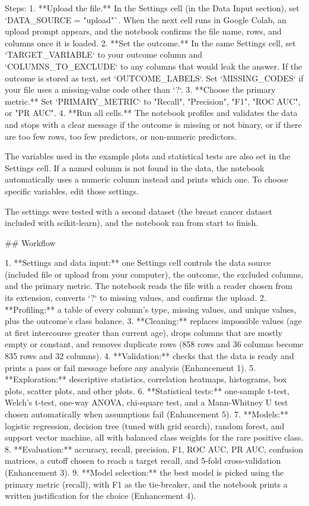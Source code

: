 Steps:
1. **Upload the file.** In the Settings cell (in the Data Input section), set `DATA_SOURCE = "upload"`. When the next cell runs in Google Colab, an upload prompt appears, and the notebook confirms the file name, rows, and columns once it is loaded.
2. **Set the outcome.** In the same Settings cell, set `TARGET_VARIABLE` to your outcome column and `COLUMNS_TO_EXCLUDE` to any columns that would leak the answer. If the outcome is stored as text, set `OUTCOME_LABELS`. Set `MISSING_CODES` if your file uses a missing-value code other than `?`.
3. **Choose the primary metric.** Set `PRIMARY_METRIC` to "Recall", "Precision", "F1", "ROC AUC", or "PR AUC".
4. **Run all cells.** The notebook profiles and validates the data and stops with a clear message if the outcome is missing or not binary, or if there are too few rows, too few predictors, or non-numeric predictors.

The variables used in the example plots and statistical tests are also set in the Settings cell. If a named column is not found in the data, the notebook automatically uses a numeric column instead and prints which one. To choose specific variables, edit those settings.

The settings were tested with a second dataset (the breast cancer dataset included with scikit-learn), and the notebook ran from start to finish.

## Workflow

1. **Settings and data input:** one Settings cell controls the data source (included file or upload from your computer), the outcome, the excluded columns, and the primary metric. The notebook reads the file with a reader chosen from its extension, converts `?` to missing values, and confirms the upload.
2. **Profiling:** a table of every column's type, missing values, and unique values, plus the outcome's class balance.
3. **Cleaning:** replaces impossible values (age at first intercourse greater than current age), drops columns that are mostly empty or constant, and removes duplicate rows (858 rows and 36 columns become 835 rows and 32 columns).
4. **Validation:** checks that the data is ready and prints a pass or fail message before any analysis (Enhancement 1).
5. **Exploration:** descriptive statistics, correlation heatmaps, histograms, box plots, scatter plots, and other plots.
6. **Statistical tests:** one-sample t-test, Welch's t-test, one-way ANOVA, chi-square test, and a Mann-Whitney U test chosen automatically when assumptions fail (Enhancement 5).
7. **Models:** logistic regression, decision tree (tuned with grid search), random forest, and support vector machine, all with balanced class weights for the rare positive class.
8. **Evaluation:** accuracy, recall, precision, F1, ROC AUC, PR AUC, confusion matrices, a cutoff chosen to reach a target recall, and 5-fold cross-validation (Enhancement 3).
9. **Model selection:** the best model is picked using the primary metric (recall), with F1 as the tie-breaker, and the notebook prints a written justification for the choice (Enhancement 4).


